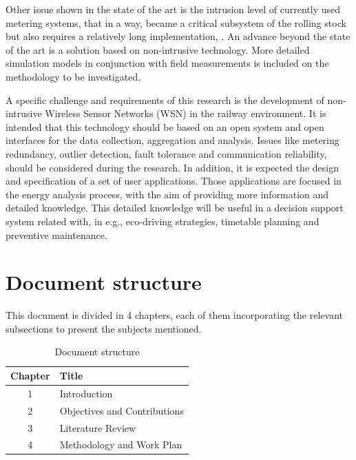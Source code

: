Other issue shown in the state of the art is the intrusion level of currently used metering systems, that in a way, became a critical subsystem of the rolling stock but also requires a relatively long implementation, \cite{shift2rail2015}. 
An advance beyond the state of the art is a solution based on non-intrusive technology. More detailed simulation models in conjunction with field measurements is included on the methodology to be investigated.




A specific challenge and requirements of this research is the development of non-intrusive Wireless Sensor Networks (WSN)  in the railway environment. 
It is intended that this technology should be based on an open system and open interfaces for the data collection, aggregation and analysis. 
Issues like metering redundancy, outlier detection, fault tolerance and communication reliability, should be considered during the research.
In addition, it is expected the design and specification of a set of user applications.
Those applications are focused in the energy analysis process, with the aim of providing more information and detailed knowledge.
This detailed knowledge will be useful in a decision support system related with, in e.g., eco-driving strategies, timetable planning and preventive maintenance.

\section{Document structure}

This document is divided in 4 chapters, each of them incorporating the relevant subsections to present the subjects mentioned. 

\begin{table}[!h]
	\label{tb:struct}
	\centering
	\caption{Document structure}
	\vspace{0.2em}
	\begin{tabular}{c|l}%
		\textbf{Chapter} & \textbf{Title}                    \\ \hline
		1       &                   Introduction             \\ \hline
		2       &                   Objectives and Contributions    \\ \hline
		3       &                   Literature Review    \\ \hline
		4       &                   Methodology and Work Plan       \\
	\end{tabular}
\end{table}